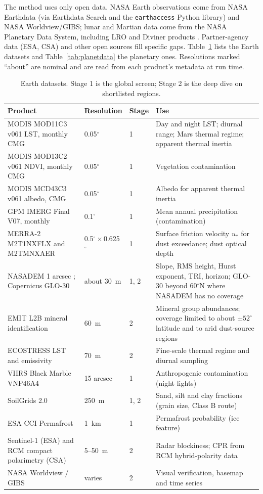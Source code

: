 \documentclass[11pt,a4paper]{article}
\begin{document}
The method uses only open data. NASA Earth observations come from NASA Earthdata (via Earthdata Search and the \texttt{earthaccess} Python library) and NASA Worldview/GIBS; lunar and Martian data come from the NASA Planetary Data System, including LRO and Diviner products \citep{pds,diviner,worldview}. Partner-agency data (ESA, CSA) and other open sources fill specific gaps. Table~\ref{tab:earthdata} lists the Earth datasets and Table~\ref{tab:planetdata} the planetary ones. Resolutions marked ``about'' are nominal and are read from each product's metadata at run time.

\begin{table}[htbp]
\centering
\caption{Earth datasets. Stage 1 is the global screen; Stage 2 is the deep dive on shortlisted regions.}
\label{tab:earthdata}
\small
\begin{tabular}{p{3.6cm}p{2.0cm}p{1.4cm}p{6.6cm}}
\toprule
Product & Resolution & Stage & Use \\
\midrule
MODIS MOD11C3 v061 LST, monthly CMG \citep{mod11c3} & 0.05$^\circ$ & 1 & Day and night LST; diurnal range; Mars thermal regime; apparent thermal inertia \\
MODIS MOD13C2 v061 NDVI, monthly CMG \citep{mod13c2} & 0.05$^\circ$ & 1 & Vegetation contamination \\
MODIS MCD43C3 v061 albedo, CMG \citep{mcd43c3} & 0.05$^\circ$ & 1 & Albedo for apparent thermal inertia \\
GPM IMERG Final V07, monthly \citep{imerg} & 0.1$^\circ$ & 1 & Mean annual precipitation (contamination) \\
MERRA-2 M2T1NXFLX and M2TMNXAER \citep{merra2flx,merra2aer} & 0.5$^\circ\times$0.625$^\circ$ & 1 & Surface friction velocity $u_*$ for dust exceedance; dust optical depth \\
NASADEM 1 arcsec \citep{nasadem}; Copernicus GLO-30 \citep{copdem} & about 30~m & 1, 2 & Slope, RMS height, Hurst exponent, TRI, horizon; GLO-30 beyond 60$^\circ$N where NASADEM has no coverage \\
EMIT L2B mineral identification \citep{emitmin,green2020} & 60~m & 2 & Mineral group abundances; coverage limited to about $\pm52^\circ$ latitude and to arid dust-source regions \\
ECOSTRESS LST and emissivity \citep{ecostress} & 70~m & 2 & Fine-scale thermal regime and diurnal sampling \\
VIIRS Black Marble VNP46A4 \citep{blackmarble} & 15 arcsec & 1 & Anthropogenic contamination (night lights) \\
SoilGrids 2.0 \citep{poggio2021} & 250~m & 1, 2 & Sand, silt and clay fractions (grain size, Class B route) \\
ESA CCI Permafrost \citep{esacci} & 1~km & 1 & Permafrost probability (ice feature) \\
Sentinel-1 (ESA) and RCM compact polarimetry (CSA) \citep{brisco2020} & 5--50~m & 2 & Radar blockiness; CPR from RCM hybrid-polarity data \\
NASA Worldview / GIBS \citep{worldview} & varies & 2 & Visual verification, basemap and time series \\
\bottomrule
\end{tabular}
\end{table}
\end{document}
